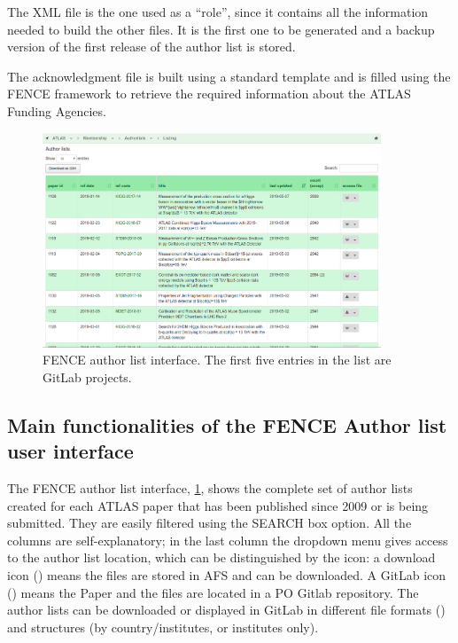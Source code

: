 The XML file is the one used as a \enquote{role}, since it contains all the information needed to build the other files.
It is the first one to be generated and a backup version of the first release of the author list is stored.

The acknowledgment  file is built using a standard template and is filled using the FENCE framework to retrieve the required information about the ATLAS Funding Agencies.

\begin{figure}[htb]
  \centering
  \includegraphics[width=0.9\textwidth]{figures/authorlist_interface.png}%
  \caption{FENCE author list interface.
    The first five entries in the list are GitLab projects.
    }%
  \label{fig:authorlist_interface}
\end{figure}

\subsection{Main functionalities of the FENCE Author list user interface}
\label{sec:Main_functionalities_of_the_FENCE_Author_list_user_interface}

The FENCE author list interface, \cref{fig:authorlist_interface}, shows the complete set of author lists created for each ATLAS paper that has been published since 2009 or is being submitted.
They are easily filtered using the SEARCH box option.
All the columns are self-explanatory; in the last column the dropdown menu gives access to the author list location, which can be distinguished by the icon:
a download icon () means the files are stored in AFS and can be downloaded.
A GitLab icon (\faGitlab) means the Paper and the files are located in a PO Gitlab repository. The author lists can be downloaded or displayed in GitLab in different file formats () and structures (by country/institutes, or institutes only).

